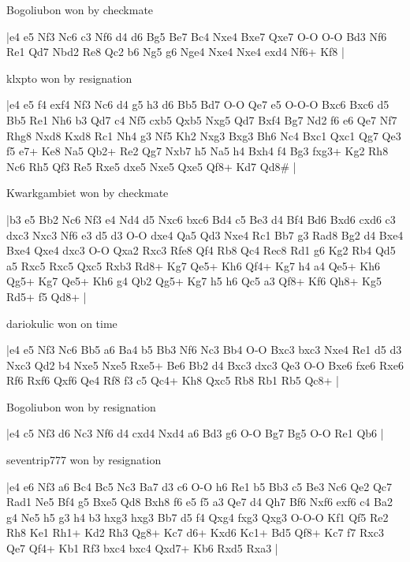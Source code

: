 \showboard

Bogoliubon won by checkmate

\makegametitle
|e4 e5 Nf3 Nc6 c3 Nf6 d4 d6 Bg5 Be7 Bc4 Nxe4 Bxe7 Qxe7 O-O O-O Bd3 Nf6 Re1 Qd7 Nbd2 Re8 Qc2 b6 Ng5 g6 Nge4 Nxe4 Nxe4 exd4 Nf6+ Kf8  |

\showboard

klxpto won by resignation

\makegametitle
|e4 e5 f4 exf4 Nf3 Nc6 d4 g5 h3 d6 Bb5 Bd7 O-O Qe7 e5 O-O-O Bxc6 Bxc6 d5 Bb5 Re1 Nh6 b3 Qd7 c4 Nf5 cxb5 Qxb5 Nxg5 Qd7 Bxf4 Bg7 Nd2 f6 e6 Qe7 Nf7 Rhg8 Nxd8 Kxd8 Rc1 Nh4 g3 Nf5 Kh2 Nxg3 Bxg3 Bh6 Nc4 Bxc1 Qxc1 Qg7 Qe3 f5 e7+ Ke8 Na5 Qb2+ Re2 Qg7 Nxb7 h5 Na5 h4 Bxh4 f4 Bg3 fxg3+ Kg2 Rh8 Nc6 Rh5 Qf3 Re5 Rxe5 dxe5 Nxe5 Qxe5 Qf8+ Kd7 Qd8\#  |

\showboard

Kwarkgambiet won by checkmate

\makegametitle
|b3 e5 Bb2 Nc6 Nf3 e4 Nd4 d5 Nxc6 bxc6 Bd4 c5 Be3 d4 Bf4 Bd6 Bxd6 cxd6 c3 dxc3 Nxc3 Nf6 e3 d5 d3 O-O dxe4 Qa5 Qd3 Nxe4 Rc1 Bb7 g3 Rad8 Bg2 d4 Bxe4 Bxe4 Qxe4 dxc3 O-O Qxa2 Rxc3 Rfe8 Qf4 Rb8 Qc4 Rec8 Rd1 g6 Kg2 Rb4 Qd5 a5 Rxc5 Rxc5 Qxc5 Rxb3 Rd8+ Kg7 Qe5+ Kh6 Qf4+ Kg7 h4 a4 Qe5+ Kh6 Qg5+ Kg7 Qe5+ Kh6 g4 Qb2 Qg5+ Kg7 h5 h6 Qc5 a3 Qf8+ Kf6 Qh8+ Kg5 Rd5+ f5 Qd8+  |

\showboard

dariokulic won on time

\makegametitle
|e4 e5 Nf3 Nc6 Bb5 a6 Ba4 b5 Bb3 Nf6 Nc3 Bb4 O-O Bxc3 bxc3 Nxe4 Re1 d5 d3 Nxc3 Qd2 b4 Nxe5 Nxe5 Rxe5+ Be6 Bb2 d4 Bxc3 dxc3 Qe3 O-O Bxe6 fxe6 Rxe6 Rf6 Rxf6 Qxf6 Qe4 Rf8 f3 c5 Qc4+ Kh8 Qxc5 Rb8 Rb1 Rb5 Qc8+  |

\showboard

Bogoliubon won by resignation

\makegametitle
|e4 c5 Nf3 d6 Nc3 Nf6 d4 cxd4 Nxd4 a6 Bd3 g6 O-O Bg7 Bg5 O-O Re1 Qb6  |

\showboard

seventrip777 won by resignation

\makegametitle
|e4 e6 Nf3 a6 Bc4 Bc5 Nc3 Ba7 d3 c6 O-O h6 Re1 b5 Bb3 c5 Be3 Nc6 Qe2 Qc7 Rad1 Ne5 Bf4 g5 Bxe5 Qd8 Bxh8 f6 e5 f5 a3 Qe7 d4 Qh7 Bf6 Nxf6 exf6 c4 Ba2 g4 Ne5 h5 g3 h4 b3 hxg3 hxg3 Bb7 d5 f4 Qxg4 fxg3 Qxg3 O-O-O Kf1 Qf5 Re2 Rh8 Ke1 Rh1+ Kd2 Rh3 Qg8+ Kc7 d6+ Kxd6 Kc1+ Bd5 Qf8+ Kc7 f7 Rxc3 Qe7 Qf4+ Kb1 Rf3 bxc4 bxc4 Qxd7+ Kb6 Rxd5 Rxa3  |

